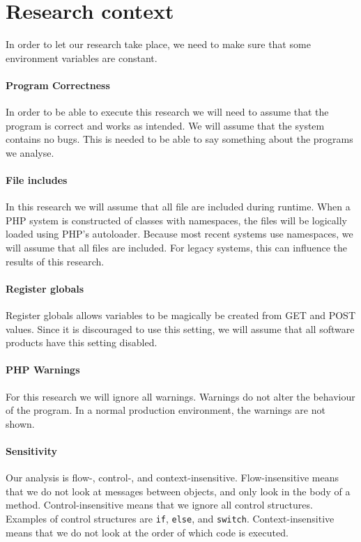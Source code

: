 \documentclass[../main.tex]{subfiles}
\begin{document}
    \section{Research context}\label{sec:research_context}
    In order to let our research take place, we need to make sure that some environment variables are constant.
    
    \paragraph{Program Correctness}
    In order to be able to execute this research we will need to assume that the program is correct and works as intended. 
    We will assume that the system contains no bugs.
    This is needed to be able to say something about the programs we analyse.
    
    \paragraph{File includes}
    In this research we will assume that all file are included during runtime. 
    When a PHP system is constructed of classes with namespaces, the files will be logically loaded using PHP's autoloader.
    Because most recent systems use namespaces, we will assume that all files are included.
    For legacy systems, this can influence the results of this research.
    
    \paragraph{Register globals}
    Register globals allows variables to be magically be created from GET and POST values.
    Since it is discouraged to use this setting, we will assume that all software products have this setting disabled.
    
    \paragraph{PHP Warnings}
    For this research we will ignore all warnings.
    Warnings do not alter the behaviour of the program.
    In a normal production environment, the warnings are not shown.
    
    \paragraph{Sensitivity}
    Our analysis is flow-, control-, and context-insensitive.
    Flow-insensitive means that we do not look at messages between objects, and only look in the body of a method.
    Control-insensitive means that we ignore all control structures. 
    Examples of control structures are \texttt{if}, \texttt{else}, and \texttt{switch}.
    Context-insensitive means that we do not look at the order of which code is executed.
     
    
\end{document}
